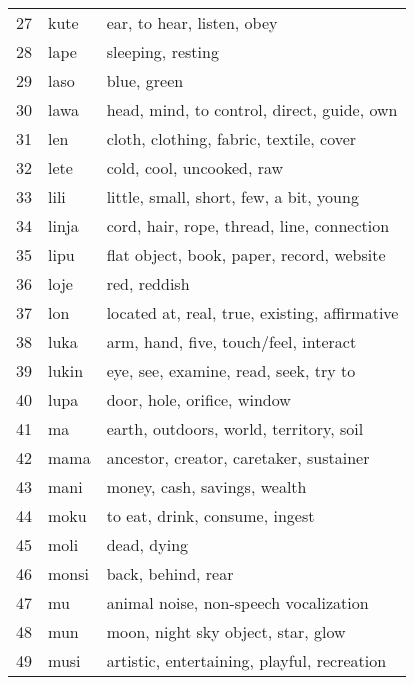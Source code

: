 \documentclass[11pt]{article}
\begin{document}
{\begin{multicols}{2}[]
\begin{center}
\begin{tabularx}{\linewidth}{rlX}
27 & kute & ear, to hear, listen, obey\\
28 & lape & sleeping, resting\\
29 & laso & blue, green\\
30 & lawa & head, mind, to control, direct, guide, own\\
31 & len & cloth, clothing, fabric, textile, cover\\
32 & lete & cold, cool, uncooked, raw\\
33 & lili & little, small, short, few, a bit, young\\
34 & linja & cord, hair, rope, thread, line, connection\\
35 & lipu & flat object, book, paper, record, website\\
36 & loje & red, reddish\\
37 & lon & located at, real, true, existing, affirmative\\
38 & luka & arm, hand, five, touch/feel, interact\\
39 & lukin & eye, see, examine, read, seek, try to\\
40 & lupa & door, hole, orifice, window\\
41 & ma & earth, outdoors, world, territory, soil\\
42 & mama & ancestor, creator, caretaker, sustainer\\
43 & mani & money, cash, savings, wealth\\
44 & moku & to eat, drink, consume, ingest\\
45 & moli & dead, dying\\
46 & monsi & back, behind, rear\\
47 & mu & animal noise, non-speech vocalization\\
48 & mun & moon, night sky object, star, glow\\
49 & musi & artistic, entertaining, playful, recreation\\
\end{tabularx}
\end{center}



\end{multicols}}
\end{document}
